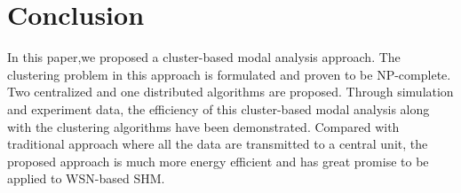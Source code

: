 \section{Conclusion}
\label{sec:conclusion}
In this paper,we proposed a cluster-based modal analysis approach. The clustering problem in this approach is formulated and proven to be NP-complete.  Two centralized and one distributed algorithms are proposed. Through simulation and experiment data, the efficiency of this cluster-based modal analysis along with the clustering algorithms have been demonstrated. Compared with traditional approach where all the data are transmitted to a central unit, the proposed approach is much more energy efficient and has great promise to be applied to WSN-based SHM.